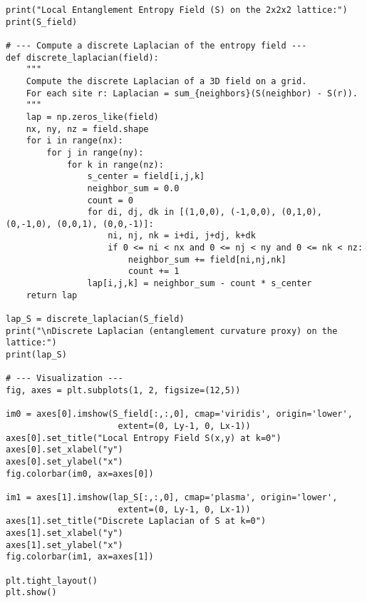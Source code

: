 \documentclass[12pt]{article}
\begin{document}
\begin{verbatim}
print("Local Entanglement Entropy Field (S) on the 2x2x2 lattice:")
print(S_field)

# --- Compute a discrete Laplacian of the entropy field ---
def discrete_laplacian(field):
    """
    Compute the discrete Laplacian of a 3D field on a grid.
    For each site r: Laplacian = sum_{neighbors}(S(neighbor) - S(r)).
    """
    lap = np.zeros_like(field)
    nx, ny, nz = field.shape
    for i in range(nx):
        for j in range(ny):
            for k in range(nz):
                s_center = field[i,j,k]
                neighbor_sum = 0.0
                count = 0
                for di, dj, dk in [(1,0,0), (-1,0,0), (0,1,0), (0,-1,0), (0,0,1), (0,0,-1)]:
                    ni, nj, nk = i+di, j+dj, k+dk
                    if 0 <= ni < nx and 0 <= nj < ny and 0 <= nk < nz:
                        neighbor_sum += field[ni,nj,nk]
                        count += 1
                lap[i,j,k] = neighbor_sum - count * s_center
    return lap

lap_S = discrete_laplacian(S_field)
print("\nDiscrete Laplacian (entanglement curvature proxy) on the lattice:")
print(lap_S)

# --- Visualization ---
fig, axes = plt.subplots(1, 2, figsize=(12,5))

im0 = axes[0].imshow(S_field[:,:,0], cmap='viridis', origin='lower',
                      extent=(0, Ly-1, 0, Lx-1))
axes[0].set_title("Local Entropy Field S(x,y) at k=0")
axes[0].set_xlabel("y")
axes[0].set_ylabel("x")
fig.colorbar(im0, ax=axes[0])

im1 = axes[1].imshow(lap_S[:,:,0], cmap='plasma', origin='lower',
                      extent=(0, Ly-1, 0, Lx-1))
axes[1].set_title("Discrete Laplacian of S at k=0")
axes[1].set_xlabel("y")
axes[1].set_ylabel("x")
fig.colorbar(im1, ax=axes[1])

plt.tight_layout()
plt.show()
\end{verbatim}
\end{document}
